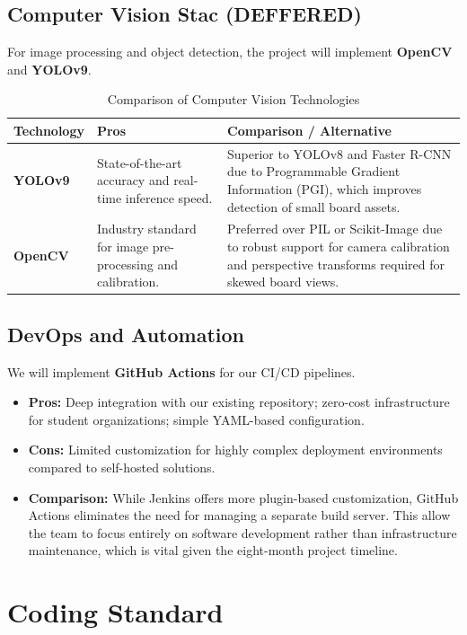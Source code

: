 \documentclass{article}
\begin{document}
\subsection{Computer Vision Stac (DEFFERED)}
For image processing and object detection, the project will implement \textbf{OpenCV} and \textbf{YOLOv9}.

\begin{table}[h!]
\centering
\caption{Comparison of Computer Vision Technologies}
\label{tab:cv-tech-comparison}
\begin{tabularx}{\textwidth}{|l|X|X|}
\hline
\textbf{Technology} & \textbf{Pros} & \textbf{Comparison / Alternative} \\ \hline
\textbf{YOLOv9} & State-of-the-art accuracy and real-time inference speed. & Superior to YOLOv8 and Faster R-CNN due to Programmable Gradient Information (PGI), which improves detection of small board assets. \\ \hline
\textbf{OpenCV} & Industry standard for image pre-processing and calibration. & Preferred over PIL or Scikit-Image due to robust support for camera calibration and perspective transforms required for skewed board views. \\ \hline
\end{tabularx}
\end{table}

\subsection{DevOps and Automation}
We will implement \textbf{GitHub Actions} for our CI/CD pipelines.

\begin{itemize}
    \item \textbf{Pros:} Deep integration with our existing repository; zero-cost infrastructure for student organizations; simple YAML-based configuration.
    \item \textbf{Cons:} Limited customization for highly complex deployment environments compared to self-hosted solutions.
    \item \textbf{Comparison:} While Jenkins offers more plugin-based customization, GitHub Actions eliminates the need for managing a separate build server. This allow the team to focus entirely on software development rather than infrastructure maintenance, which is vital given the eight-month project timeline.
\end{itemize}

\section{Coding Standard}
\end{document}
